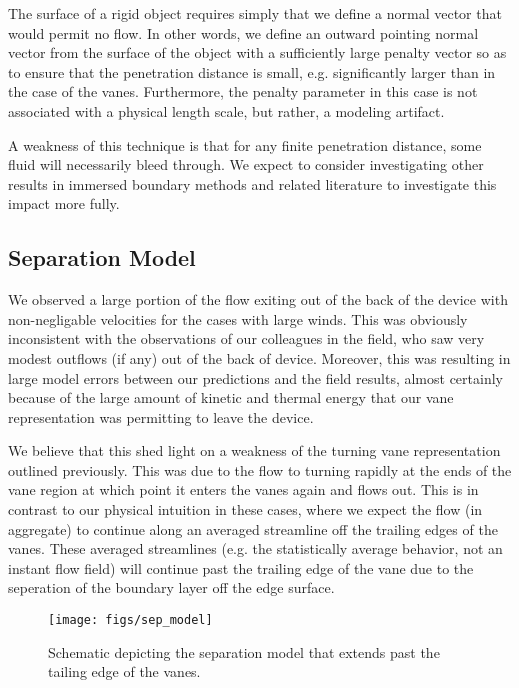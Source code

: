 The surface of a rigid object requires simply that we
define a normal vector that would permit no flow. In other words, we
define an outward pointing normal vector from the surface of the object
with a sufficiently large penalty vector so as to ensure that the
penetration distance is small, e.g. significantly larger than in the
case of the vanes. Furthermore, the penalty parameter in this case is
not associated with a physical length scale, but rather, a modeling
artifact. 


A weakness of this technique is that for
any finite penetration distance, some fluid will necessarily bleed
through. We expect to consider investigating other results in 
immersed boundary methods and related literature to investigate this
impact more fully. 


\subsection{Separation Model}

We observed a large portion of the flow exiting out of the back of 
the device with non-negligable velocities for the cases with large winds. 
This was obviously inconsistent with the observations of our colleagues 
in the field, who saw very modest outflows (if any) out of the back of device. 
Moreover, this was resulting in large model errors between our predictions and the 
field results, almost certainly because of the large amount of kinetic and thermal 
energy that our vane representation was permitting to leave the device. 

We believe that this shed light on a weakness of the turning vane representation 
outlined previously. This was due to the flow to turning rapidly at the ends of the vane
region at which point it enters the vanes again and flows out. This is in contrast to our 
physical intuition in these cases, where we expect the flow (in aggregate) to continue along an 
averaged streamline off the trailing edges of the vanes. These averaged streamlines 
(e.g. the statistically average behavior, not an instant flow field) will continue 
past the trailing edge of the vane due to the seperation of the boundary layer off the edge surface.


\begin{figure}[!htb]
  \begin{center}
    \texttt{[image: figs/sep\_model]}
    \caption{Schematic depicting the separation model that extends past the tailing edge of the vanes.}
    \label{fig:sep_model}
  \end{center}
\end{figure}

